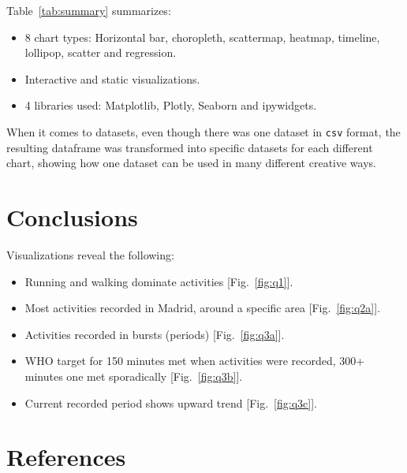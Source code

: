 \documentclass[a4paper,11pt]{article}
\begin{document}
\par
Table~\ref{tab:summary} summarizes:

\begin{itemize}
	\item 8 chart types: Horizontal bar, choropleth, scattermap, heatmap, timeline,
	      lollipop, scatter and regression.
	\item Interactive and static visualizations.
	\item 4 libraries used: Matplotlib, Plotly, Seaborn and ipywidgets.
\end{itemize}

\par
When it comes to datasets, even though there was one dataset in \texttt{csv}
format, the resulting dataframe was transformed into specific datasets for each
different chart, showing how one dataset can be used in many different creative
ways.

\section{Conclusions}

\par
Visualizations reveal the following:

\begin{itemize}
	\item Running and walking dominate activities [Fig.~\ref{fig:q1}].
	\item Most activities recorded in Madrid, around a specific area [Fig.~\ref{fig:q2a}].
	\item Activities recorded in bursts (periods) [Fig.~\ref{fig:q3a}].
	\item WHO target for 150 minutes met when activities were recorded, 300+
	      minutes one met sporadically [Fig.~\ref{fig:q3b}].
	\item Current recorded period shows upward trend [Fig.~\ref{fig:q3c}].
\end{itemize}

\pagebreak

\section{References}
\printbibliography[heading=none]
\end{document}
